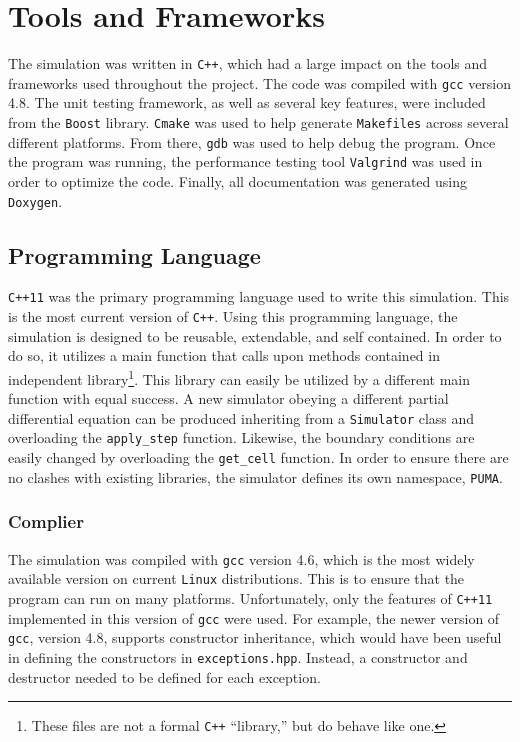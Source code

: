 \documentclass[a4paper,11pt]{article}
\begin{document}
\section{Tools and Frameworks}

The simulation was written in \texttt{C++}, which had a large impact on the tools and frameworks used throughout the project.  The code was compiled with \texttt{gcc} version 4.8.  The unit testing framework, as well as several key features, were included from the \texttt{Boost} library.  \texttt{Cmake} was used to help generate \texttt{Makefiles} across several different platforms.  From there, \texttt{gdb} was used to help debug the program.  Once the program was running, the performance testing tool \texttt{Valgrind} was used in order to optimize the code.  Finally, all documentation was generated using \texttt{Doxygen}.

\subsection{Programming Language}

\texttt{C++11} was the primary programming language used to write this simulation.  This is the most current version of \texttt{C++}.  Using this programming language, the simulation is designed to be  reusable, extendable, and self contained. In order to do so, it utilizes a main function that calls upon methods contained in independent library\footnote{These files are not a formal \texttt{C++} ``library,'' but do behave like one.}.  This library can easily be utilized by a different main function with equal success.  A new simulator obeying a different partial differential equation can be produced inheriting from a \texttt{Simulator} class and overloading the \texttt{apply\_step} function.  Likewise, the boundary conditions are easily changed by overloading the \texttt{get\_cell} function.  In order to ensure there are no clashes with existing libraries, the simulator defines its own namespace, \texttt{PUMA}.   

\subsubsection{Complier}

The simulation was compiled with \texttt{gcc} version 4.6, which is the most widely available version on current \texttt{Linux} distributions.  This is to ensure that the program can run on many platforms.  Unfortunately, only the features of \texttt{C++11} implemented in this version of \texttt{gcc} were used.  For example, the newer version of \texttt{gcc}, version 4.8, supports constructor inheritance, which would have been useful in defining the constructors in \texttt{exceptions.hpp}.  Instead, a constructor and destructor needed to be defined for each exception. 
\end{document}
